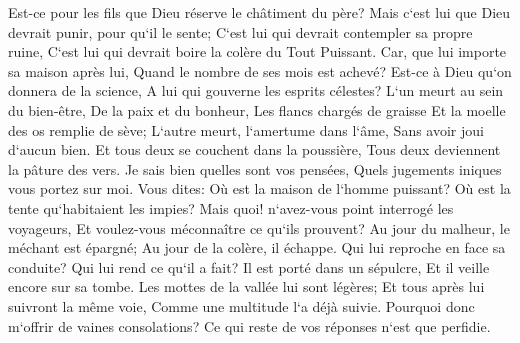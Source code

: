 \verse Est-ce pour les fils que Dieu réserve le châtiment du père? Mais c`est lui que Dieu devrait punir, pour qu`il le sente; 
\verse C`est lui qui devrait contempler sa propre ruine, C`est lui qui devrait boire la colère du Tout Puissant. 
\verse Car, que lui importe sa maison après lui, Quand le nombre de ses mois est achevé? 
\verse Est-ce à Dieu qu`on donnera de la science, A lui qui gouverne les esprits célestes? 
\verse L`un meurt au sein du bien-être, De la paix et du bonheur, 
\verse Les flancs chargés de graisse Et la moelle des os remplie de sève; 
\verse L`autre meurt, l`amertume dans l`âme, Sans avoir joui d`aucun bien. 
\verse Et tous deux se couchent dans la poussière, Tous deux deviennent la pâture des vers. 
\verse Je sais bien quelles sont vos pensées, Quels jugements iniques vous portez sur moi. 
\verse Vous dites: Où est la maison de l`homme puissant? Où est la tente qu`habitaient les impies? 
\verse Mais quoi! n`avez-vous point interrogé les voyageurs, Et voulez-vous méconnaître ce qu`ils prouvent? 
\verse Au jour du malheur, le méchant est épargné; Au jour de la colère, il échappe. 
\verse Qui lui reproche en face sa conduite? Qui lui rend ce qu`il a fait? 
\verse Il est porté dans un sépulcre, Et il veille encore sur sa tombe. 
\verse Les mottes de la vallée lui sont légères; Et tous après lui suivront la même voie, Comme une multitude l`a déjà suivie. 
\verse Pourquoi donc m`offrir de vaines consolations? Ce qui reste de vos réponses n`est que perfidie. 

